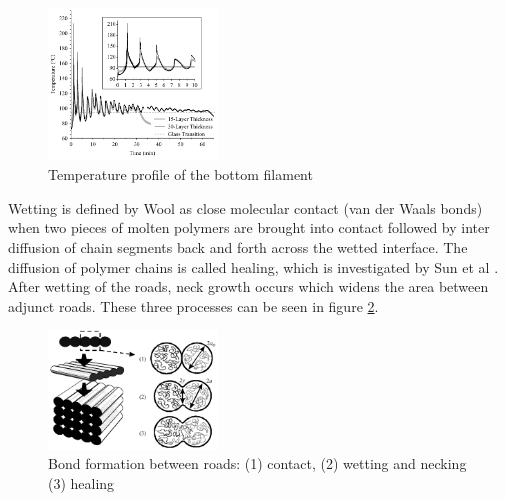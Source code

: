 \begin{figure}[H]
    \centering
    \includegraphics[width=0.4\textwidth]{chapter_2/figures/temperaturehistory.PNG}
    \caption{Temperature profile of the bottom filament \cite{Sun2008}
    \label{fig:temperaturehistory}}
\end{figure}

Wetting is defined by Wool \cite{WoolStrenghtInterfaces} as close molecular contact (van der Waals bonds) when two pieces of molten polymers are brought into contact followed by inter diffusion of chain segments back and forth across the wetted interface. The diffusion of polymer chains is called healing, which is investigated by Sun et al \cite{Sun2008}. After wetting of the roads, neck growth occurs which widens the area between adjunct roads. These three processes can be seen in figure \ref{fig:polymerwelding}. 

\begin{figure}[H]
    \centering
    \includegraphics[width=0.4\textwidth]{chapter_2/figures/polymerwelding.PNG}
    \caption{Bond formation between roads: (1) contact, (2) wetting and necking (3) healing  \cite{Sun2008}}
    \label{fig:polymerwelding}
\end{figure}


